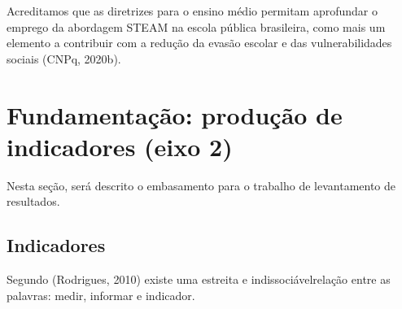 \documentclass[
12pt,		%
openright,	%
twoside,  %
a4paper,			%
chapter=TITLE,		%
english,			%
french,				%
spanish,			%
brazil				%
]{USPSC-classe/USPSC}
\begin{document}
\noindent\begin{center}\mbox{\centering{}}\end{center}


Acreditamos que as diretrizes para o ensino m\'edio permitam aprofundar o emprego da abordagem STEAM na escola p\'ublica brasileira, como mais um elemento a contribuir com a redu\c{c}\~ao da evas\~ao escolar e das vulnerabilidades sociais  (CNPq, 2020b).

















\section[Fundamenta\c{c}\~ao: produ\c{c}\~ao de indicadores (eixo 2)]{Fundamenta\c{c}\~ao: produ\c{c}\~ao de indicadores (eixo 2)}\label{Fundamenta\c{c}\~ao: produ\c{c}\~ao de indicadores (eixo 2)}
Nesta se\c{c}\~ao, ser\'a descrito o embasamento para o trabalho de levantamento de resultados.

















\subsection[Indicadores]{Indicadores}\label{Indicadores}
Segundo (Rodrigues, 2010) existe uma \textquotedbl estreita e indissoci\'avel\textquotedbl  rela\c{c}\~ao entre as palavras: medir, informar e \textquotedbl indicador\textquotedbl .
\end{document}
